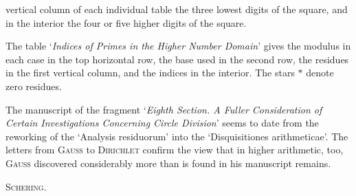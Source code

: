 vertical column of each individual table the three lowest digits of the square, and in the interior the four or five higher digits of the square.
\par The table ‘\textit{Indices of Primes in the Higher Number Domain}’ gives the modulus in each case in the top horizontal row, the base used in the second row, the residues in the first vertical column, and the indices in the interior. The stars $*$ denote zero residues.
\par The manuscript of the fragment ‘\textit{Eighth Section. A Fuller Consideration of Certain Investigations Concerning Circle Division}’ seems to date from the reworking of the ‘Analysis residuorum’ into the ‘Disquisitiones arithmeticae’. The letters from \textsc{Gauss} to \textsc{Dirichlet} confirm the view that in higher arithmetic, too, \textsc{Gauss} discovered considerably more than is found in his manuscript remains.
\begin{flushright}\textsc{Schering}.\end{flushright}
